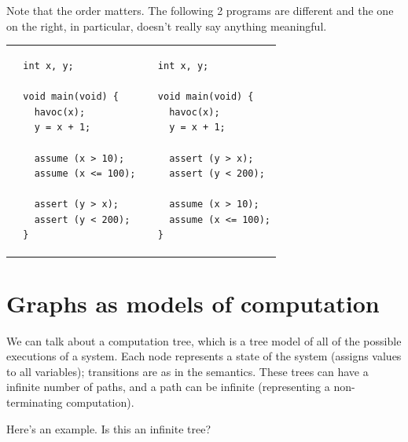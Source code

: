 \documentclass[11pt]{article}
\begin{document}
\newpage
Note that the order matters. The following 2 programs are different and the one on the right, in particular, doesn't really say anything meaningful.

\begin{tabular}{ll}
\begin{minipage}{.45\textwidth}
  \begin{lstlisting}
  int x, y;
  
  void main(void) {
    havoc(x);
    y = x + 1;

    assume (x > 10);
    assume (x <= 100);

    assert (y > x);
    assert (y < 200);
  }
\end{lstlisting}
\end{minipage}
&
\begin{minipage}{.45\textwidth}
\begin{lstlisting}
  int x, y;
  
  void main(void) {
    havoc(x);
    y = x + 1;

    assert (y > x);
    assert (y < 200);

    assume (x > 10);
    assume (x <= 100);
  }
\end{lstlisting}
\end{minipage}
\end{tabular}

\section*{Graphs as models of computation}
We can talk about a computation tree, which is a tree model of all of the possible executions of a system. Each node represents a state of the system (assigns values to all variables); transitions are as in the semantics. These trees can have a infinite number of paths, and a path can be infinite (representing a non-terminating computation).

Here's an example. Is this an infinite tree?
\end{document}
